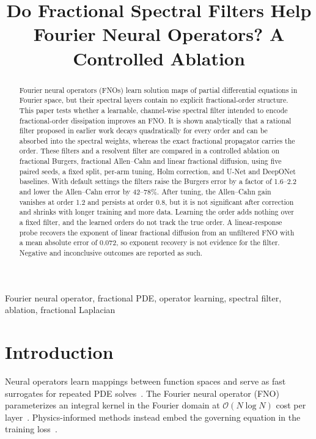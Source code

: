 \documentclass[conference]{IEEEtran}
\begin{document}
\title{Do Fractional Spectral Filters Help Fourier Neural Operators? A Controlled Ablation}

\author{
}

\maketitle
\thispagestyle{firstpage}

\begin{abstract}
Fourier neural operators (FNOs) learn solution maps of partial differential equations in Fourier space, but their spectral layers contain no explicit fractional-order structure. This paper tests whether a learnable, channel-wise spectral filter intended to encode fractional-order dissipation improves an FNO. It is shown analytically that a rational filter proposed in earlier work decays quadratically for every order and can be absorbed into the spectral weights, whereas the exact fractional propagator carries the order. These filters and a resolvent filter are compared in a controlled ablation on fractional Burgers, fractional Allen--Cahn and linear fractional diffusion, using five paired seeds, a fixed split, per-arm tuning, Holm correction, and U-Net and DeepONet baselines. With default settings the filters raise the Burgers error by a factor of 1.6--2.2 and lower the Allen--Cahn error by 42--78\%. After tuning, the Allen--Cahn gain vanishes at order 1.2 and persists at order 0.8, but it is not significant after correction and shrinks with longer training and more data. Learning the order adds nothing over a fixed filter, and the learned orders do not track the true order. A linear-response probe recovers the exponent of linear fractional diffusion from an unfiltered FNO with a mean absolute error of 0.072, so exponent recovery is not evidence for the filter. Negative and inconclusive outcomes are reported as such.
\end{abstract}

\begin{IEEEkeywords}
Fourier neural operator, fractional PDE, operator learning, spectral filter, ablation, fractional Laplacian
\end{IEEEkeywords}

\section{Introduction}
Neural operators learn mappings between function spaces and serve as fast surrogates for repeated PDE solves~\cite{kovachki2023neural,lu2021learning}. The Fourier neural operator (FNO) parameterizes an integral kernel in the Fourier domain at $\mathcal{O}(N\log N)$ cost per layer~\cite{li2021fourier,lu2022comprehensive}. Physics-informed methods instead embed the governing equation in the training loss~\cite{raissi2019physics,pang2019fpinns}.
\end{document}
